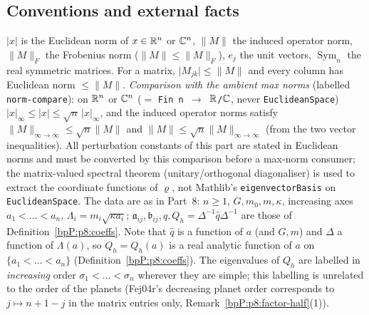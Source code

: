 \subsection{Conventions and external facts}\label{bpP:p9:conv}

$\lvert x\rvert$ is the Euclidean norm of $x\in\mathbb{R}^n$ or $\mathbb{C}^n$, $\lVert M\rVert$ the induced operator norm, $\lVert M\rVert_F$ the Frobenius norm ($\lVert M\rVert\le\lVert M\rVert_F$), $e_j$ the unit vectors, $\operatorname{Sym}_n$ the real symmetric matrices. For a matrix, $\lvert M_{jk}\rvert\le\lVert M\rVert$ and every column has Euclidean norm $\le\lVert M\rVert$. \emph{Comparison with the ambient max norms} (labelled \texttt{norm-compare}\label{bpP:p9:norm-compare}): on $\mathbb{R}^n$ or $\mathbb{C}^n$ ($=$ \texttt{Fin n $\to$ $\mathbb{R}$/$\mathbb{C}$}, never \texttt{EuclideanSpace}) $\lvert x\rvert_\infty\le\lvert x\rvert\le\sqrt n\,\lvert x\rvert_\infty$, and the induced operator norms satisfy $\lVert M\rVert_{\infty\to\infty}\le\sqrt n\lVert M\rVert$ and $\lVert M\rVert\le\sqrt n\lVert M\rVert_{\infty\to\infty}$ (from the two vector inequalities). All perturbation constants of this part are stated in Euclidean norms and must be converted by this comparison before a max-norm consumer; the matrix-valued spectral theorem (unitary/orthogonal diagonaliser) is used to extract the coordinate functions of $\varrho$, not Mathlib's \texttt{eigenvectorBasis} on \texttt{EuclideanSpace}. The data are as in Part~8: $n\ge1$, $G,m_0,m,\kappa$, increasing axes $a_1<\dots<a_n$, $\Lambda_i=m_i\sqrt{\kappa a_i}$; $\mathfrak a_{ij},\mathfrak b_{ij},\hat q,Q_h=\Delta^{-1}\hat q\Delta^{-1}$ are those of Definition~\ref{bpP:p8:coeffs}. Note that $\hat q$ is a function of $a$ (and $G,m$) and $\Delta$ a function of $\Lambda(a)$, so $Q_h=Q_h(a)$ is a real analytic function of $a$ on $\{a_1<\dots<a_n\}$ (Definition~\ref{bpP:p8:coeffs}).
The eigenvalues of $Q_h$ are labelled in \emph{increasing} order $\sigma_1<\dots<\sigma_n$ wherever they are simple; this labelling is unrelated to the order of the planets (Fej04r's decreasing planet order corresponds to $j\mapsto n+1-j$ in the matrix entries only, Remark~\ref{bpP:p8:factor-half}(1)).

